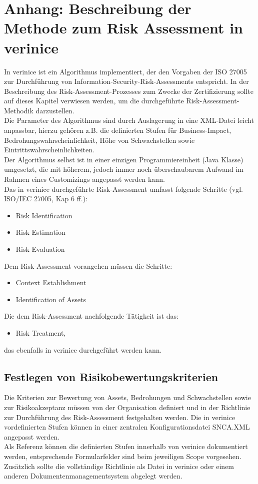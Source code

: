 \documentclass[a4paper,10pt]{book}
\begin{document}
\chapter{Anhang: Beschreibung der Methode zum Risk Assessment in verinice}
In verinice ist ein Algorithmus implementiert, der den Vorgaben der ISO 27005
zur Durchführung von Information-Security-Risk-Assessments
entspricht. In der Beschreibung des Risk-Assessment-Prozesses zum Zwecke der
Zertifizierung sollte auf dieses Kapitel verwiesen werden, um die durchgeführte
Risk-Assessment-Methodik darzustellen.
\newline\\
Die Parameter des Algorithmus sind durch Auslagerung in eine XML-Datei
leicht anpassbar, hierzu gehören z.B. die definierten Stufen für Business-Impact,
Bedrohungswahrscheinlichkeit, Höhe von Schwachstellen sowie
Eintrittswahrscheinlichkeiten.
\newline\\
Der Algorithmus selbst ist in einer einzigen Programmiereinheit (Java Klasse)
umgesetzt, die mit höherem, jedoch immer noch überschaubarem Aufwand im Rahmen
eines Customizings angepasst werden kann.
\newline\\
Das in verinice durchgeführte Risk-Assessment umfasst folgende Schritte (vgl.
ISO/IEC 27005, Kap 6 ff.):
\begin{itemize}
 \item Risk Identification
 \item Risk Estimation
 \item Risk Evaluation
\end{itemize}
Dem Risk-Assessment vorangehen müssen die Schritte:
\begin{itemize}
 \item Context Establishment
 \item Identification of Assets
\end{itemize}
Die dem Risk-Assessment nachfolgende Tätigkeit ist das:
\begin{itemize}
 \item Risk Treatment,
\end{itemize}
das ebenfalls in verinice durchgeführt werden kann.

\section{Festlegen von Risikobewertungskriterien}
Die Kriterien zur Bewertung von Assets, Bedrohungen und Schwachstellen sowie
zur Risikoakzeptanz müssen von der Organisation definiert und in der Richtlinie
zur Durchführung des Risk-Assessment festgehalten werden. Die in verinice vordefinierten
Stufen können in einer zentralen Konfigurationsdatei SNCA.XML angepasst werden.
\newline\\
Als Referenz können die definierten Stufen innerhalb von verinice dokumentiert
werden, entsprechende Formularfelder sind beim jeweiligen Scope
vorgesehen. Zusätzlich sollte die vollständige Richtlinie als Datei in verinice
oder einem anderen Dokumentenmanagementsystem abgelegt werden.
\end{document}
